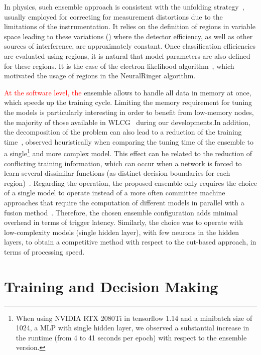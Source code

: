 In physics, such ensemble approach is consistent with the unfolding
strategy~\cite{Cowan1998}, usually employed for correcting for
measurement distortions due to the limitations of the instrumentation. It relies
on the definition of regions in variable space leading to these
variations (\eteta{}) where the detector efficiency, as well as other
sources of interference, are approximately constant. Once classification
efficiencies are evaluated using regions, it is natural that model parameters
are also defined for these regions. It is the case of the electron likelihood
algorithm~\cite{atlas_electron_id_offline}, which motivated the usage of
\eteta{} regions in the NeuralRinger algorithm.

\textcolor{red}{At the software level, the} ensemble allows to handle all data in memory at once,
which speeds up the training cycle. Limiting the memory requirement for tuning
the models is particularly interesting in order to benefit from low-memory
nodes, the majority of those available in WLCG~\cite{2015_lcg_tdr} during our
developments.\@ In addition, the decomposition of the problem can also lead to a
reduction of the training time~\cite{Polikar2006}, observed heuristically when
comparing the tuning time of the ensemble to a single\footnote{
  When using NVIDIA RTX 2080Ti in tensorflow 1.14 and a minibatch size of 1024, a 
  MLP with single hidden layer, we observed a substantial increase in the runtime (from 4 
  to 41 seconds per epoch) with respect to the ensemble version.
} and more complex model.
This effect can be related to the reduction of conflicting training information,
which can occur when a network is forced to learn several dissimilar functions
(as distinct decision boundaries for each region)~\cite{Auda1999,haykin_2008}.
Regarding the operation, the proposed ensemble only requires the choice of a
single model to operate instead of a more often committee machine approaches
that require the computation of different models in parallel with a fusion
method~\cite{zhou_ensemble}.  Therefore, the chosen ensemble configuration adds
minimal overhead in terms of trigger latency. Similarly, the choice was to
operate with low-complexity models (single hidden layer), with few neurons in
the hidden layers, to obtain a competitive method with respect to the cut-based
approach, in terms of processing speed.



\section{Training and Decision Making}%
\label{sec:tuning}

